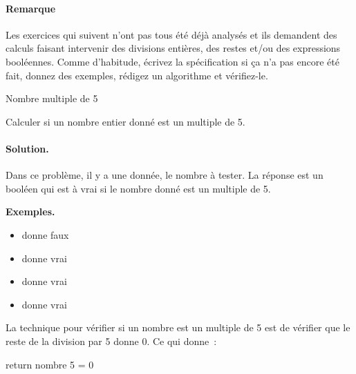 \bigskip
\bigskip
\bigskip
\begin{Emphase}
	
	\paragraph{Remarque}
	Les exercices qui suivent n’ont pas tous été déjà analysés et ils demandent
	des calculs faisant intervenir des divisions entières, des restes et/ou des
	expressions booléennes.  Comme d’habitude, écrivez la spécification si ça
	n’a pas encore été fait, donnez des exemples, rédigez un algorithme et
	vérifiez-le.

\end{Emphase}

		\begin{Exercice}{Nombre multiple de 5}

			\label{algo:mult5}
			Calculer si un nombre entier donné est un multiple de 5.

			\clearpage
			\paragraph{Solution.}
			Dans ce problème,
			il y a une donnée, le nombre à tester.
			La réponse est un booléen
			qui est à vrai si le nombre donné est un multiple de 5.
			\begin{center}
			\end{center}
			\textbf{Exemples.}
			\begin{multicols}{4}
				\begin{itemize}
					\item {} donne faux
					\item {} donne vrai
					\item {} donne vrai
					\item {} donne vrai
				\end{itemize}
			\end{multicols}
			La technique pour vérifier si un nombre est
			un multiple de 5 est de vérifier que le reste
			de la division par 5 donne 0.
			Ce qui donne~:
			\begin{langagenaturel}
				return nombre 5 = 0
			\end{langagenaturel}
		

\end{Exercice}
